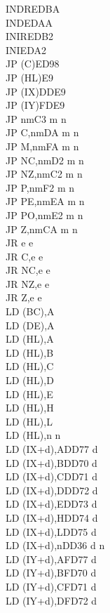 \begin{multicols}{3}
{\begin{tabbing}
		INDR\>EDBA\\
		IND\>EDAA\\
		INIR\>EDB2\\
		INI\>EDA2\\
		JP (C)\ZXN\>ED98\\
		JP (HL)\>E9\\
		JP (IX)\>DDE9\\
		JP (IY)\>FDE9\\
		JP nm\>C3 m n\\
		JP C,nm\>DA m n\\
		JP M,nm\>FA m n\\
		JP NC,nm\>D2 m n\\
		JP NZ,nm\>C2 m n\\
		JP P,nm\>F2 m n\\
		JP PE,nm\>EA m n\\
		JP PO,nm\>E2 m n\\
		JP Z,nm\>CA m n\\
		JR e e\\
		JR C,e e\\
		JR NC,e e\\
		JR NZ,e e\\
		JR Z,e e\\
		LD (BC),A\\
		LD (DE),A\\
		LD (HL),A\\
		LD (HL),B\\
		LD (HL),C\\
		LD (HL),D\\
		LD (HL),E\\
		LD (HL),H\\
		LD (HL),L\\
		LD (HL),n n\\
		LD (IX+d),A\>DD77 d\\
		LD (IX+d),B\>DD70 d\\
		LD (IX+d),C\>DD71 d\\
		LD (IX+d),D\>DD72 d\\
		LD (IX+d),E\>DD73 d\\
		LD (IX+d),H\>DD74 d\\
		LD (IX+d),L\>DD75 d\\
		LD (IX+d),n\>DD36 d n\\
		LD (IY+d),A\>FD77 d\\
		LD (IY+d),B\>FD70 d\\
		LD (IY+d),C\>FD71 d\\
		LD (IY+d),D\>FD72 d\\

\end{tabbing}}
\end{multicols}
